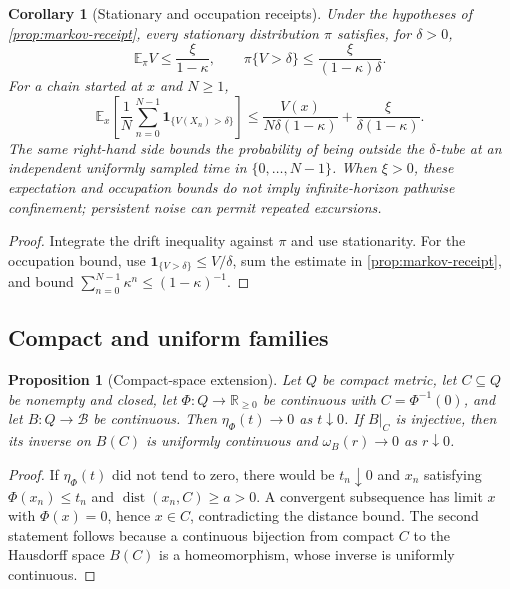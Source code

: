 \documentclass[11pt]{article}
\newtheorem{proposition}[theorem]{Proposition}
\newtheorem{corollary}[theorem]{Corollary}
\theoremstyle{definition}
\theoremstyle{remark}
\numberwithin{equation}{section}
\newcommand{\dist}{\operatorname{dist}}
\newcommand{\cB}{\mathcal B}
\begin{document}
\begin{corollary}[Stationary and occupation receipts]
\label{cor:markov-occupation}
Under the hypotheses of \cref{prop:markov-receipt}, every stationary
distribution $\pi$ satisfies, for $\delta>0$,
\[
 \mathbb E_\pi V\le\frac{\xi}{1-\kappa},
 \qquad
 \pi\{V>\delta\}\le\frac{\xi}{(1-\kappa)\delta}.
\]
For a chain started at $x$ and $N\ge1$,
\[
 \mathbb E_x\!\left[\frac1N\sum_{n=0}^{N-1}
       \mathbf1_{\{V(X_n)>\delta\}}\right]
 \le
 \frac{V(x)}{N\delta(1-\kappa)}
 +\frac{\xi}{\delta(1-\kappa)}.
\]
The same right-hand side bounds the probability of being outside the
$\delta$-tube at an independent uniformly sampled time in
$\{0,\ldots,N-1\}$.  When $\xi>0$, these expectation and occupation bounds do
not imply infinite-horizon pathwise confinement; persistent noise can permit
repeated excursions.
\end{corollary}

\begin{proof}
Integrate the drift inequality against $\pi$ and use stationarity.  For the
occupation bound, use
$\mathbf1_{\{V>\delta\}}\le V/\delta$, sum the estimate in
\cref{prop:markov-receipt}, and bound
$\sum_{n=0}^{N-1}\kappa^n\le(1-\kappa)^{-1}$.
\end{proof}

\subsection{Compact and uniform families}

\begin{proposition}[Compact-space extension]\label{prop:compact-extension}
Let $Q$ be compact metric, let $C\subseteq Q$ be nonempty and closed, let $\Phi:Q\to\mathbb R_{\ge0}$ be continuous with $C=\Phi^{-1}(0)$, and let $B:Q\to\cB$ be continuous.  Then $\eta_\Phi(t)\to0$ as $t\downarrow0$.  If $B|_C$ is injective, then its inverse on $B(C)$ is uniformly continuous and $\omega_B(r)\to0$ as $r\downarrow0$.
\end{proposition}

\begin{proof}
If $\eta_\Phi(t)$ did not tend to zero, there would be $t_n\downarrow0$ and $x_n$ satisfying $\Phi(x_n)\le t_n$ and $\dist(x_n,C)\ge a>0$.  A convergent subsequence has limit $x$ with $\Phi(x)=0$, hence $x\in C$, contradicting the distance bound.  The second statement follows because a continuous bijection from compact $C$ to the Hausdorff space $B(C)$ is a homeomorphism, whose inverse is uniformly continuous.
\end{proof}
\end{document}
